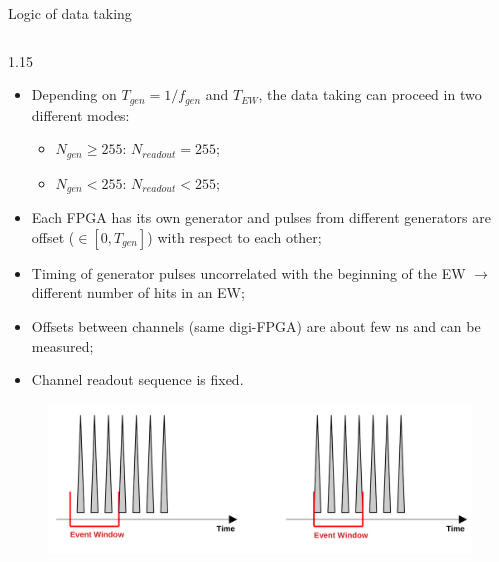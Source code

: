 \documentclass{beamer}
\begin{document}
\begin{frame}{Logic of data taking}
\begin{columns}
   \begin{column}{1.15\framewidth} 
         \setlength{\leftmargini}{1.3em}
         \vspace{-3mm}
        \begin{itemize}
         \item Depending on $T_{gen}=1/f_{gen}$ and $T_{EW}$, the data taking can proceed in two different modes:
  \begin{itemize}
  \item $N_{gen}\geq255$: $N_{readout}=255$;
    \item $N_{gen}<255$: $N_{readout}<255$;
  \end{itemize}
      \item Each FPGA has its own generator and pulses from different generators are offset ($\in [0 ,T_{gen}]$) with respect to each other;
      \item Timing of generator pulses uncorrelated with the beginning of the EW $\rightarrow$ different number of hits in an EW;
      \item Offsets between channels (same digi-FPGA) are about few ns and can be measured;
      \item Channel readout sequence is fixed.
  \end{itemize}
  \vspace{-4mm}
              \begin{figure}[H]
          \centering
          \includegraphics[width=0.8 \framewidth]{figures/png/finalimg.png}
          \label{fig:enter-label} 
      \end{figure}
   \end{column}
   \end{columns}
    \end{frame}
\end{document}
